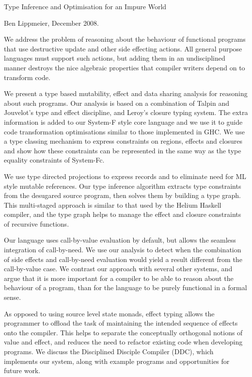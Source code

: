 \documentclass[a4paper,11pt]{report}
\begin{document}
{\Large Type Inference and Optimisation}
{\Large for an Impure World} 

Ben Lippmeier, December 2008.

We address the problem of reasoning about the behaviour of functional programs that use destructive update and other side effecting actions. All general purpose languages must support such actions, but adding them in an undisciplined manner destroys the nice algebraic properties that compiler writers depend on to transform code.

We present a type based mutability, effect and data sharing analysis for reasoning about such programs. Our analysis is based on a combination of Talpin and Jouvelot's type and effect discipline, and Leroy's closure typing system. The extra information is added to our System-F style core language and we use it to guide code transformation optimisations similar to those implemented in GHC. We use a type classing mechanism to express constraints on regions, effects and closures and show how these constraints can be represented in the same way as the type equality constraints of System-Fc. 

We use type directed projections to express records and to eliminate need for ML style mutable references. Our type inference algorithm extracts type constraints from the desugared source program, then solves them by building a type graph. This multi-staged approach is similar to that used by the Helium Haskell compiler, and the type graph helps to manage the effect and closure constraints of recursive functions. 

Our language uses call-by-value evaluation by default, but allows the seamless integration of call-by-need. We use our analysis to detect when the combination of side effects and call-by-need evaluation would yield a result different from the call-by-value case. We contrast our approach with several other systems, and argue that it is more important for a compiler to be able to reason about the behaviour of a program, than for the language to be purely functional in a formal sense.

As opposed to using source level state monads, effect typing allows the programmer to offload the task of maintaining the intended sequence of effects onto the compiler. This helps to separate the conceptually orthogonal notions of value and effect, and reduces the need to refactor existing code when developing programs. We discuss the Disciplined Disciple Compiler (DDC), which implements our system, along with example programs and opportunities for future work.
\end{document}
